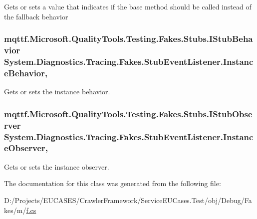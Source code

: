 Gets or sets a value that indicates if the base method should be called instead of the fallback behavior

\hypertarget{class_system_1_1_diagnostics_1_1_tracing_1_1_fakes_1_1_stub_event_listener_a73c0c067f87d82ef513bdcf0759c33cd}{
\subsubsection[{Instance\-Behavior}]{\setlength{\rightskip}{0pt plus 5cm}mqttf.\-Microsoft.\-Quality\-Tools.\-Testing.\-Fakes.\-Stubs.\-I\-Stub\-Behavior System.\-Diagnostics.\-Tracing.\-Fakes.\-Stub\-Event\-Listener.\-Instance\-Behavior\hspace{0.3cm}{\ttfamily [get]}, {\ttfamily [set]}}}\label{class_system_1_1_diagnostics_1_1_tracing_1_1_fakes_1_1_stub_event_listener_a73c0c067f87d82ef513bdcf0759c33cd}


Gets or sets the instance behavior.

\hypertarget{class_system_1_1_diagnostics_1_1_tracing_1_1_fakes_1_1_stub_event_listener_a9632efa813e08faca96bc80e3ddce724}{
\subsubsection[{Instance\-Observer}]{\setlength{\rightskip}{0pt plus 5cm}mqttf.\-Microsoft.\-Quality\-Tools.\-Testing.\-Fakes.\-Stubs.\-I\-Stub\-Observer System.\-Diagnostics.\-Tracing.\-Fakes.\-Stub\-Event\-Listener.\-Instance\-Observer\hspace{0.3cm}{\ttfamily [get]}, {\ttfamily [set]}}}\label{class_system_1_1_diagnostics_1_1_tracing_1_1_fakes_1_1_stub_event_listener_a9632efa813e08faca96bc80e3ddce724}


Gets or sets the instance observer.



The documentation for this class was generated from the following file\-:\begin{DoxyCompactItemize}
\item 
D\-:/\-Projects/\-E\-U\-C\-A\-S\-E\-S/\-Crawler\-Framework/\-Service\-E\-U\-Cases.\-Test/obj/\-Debug/\-Fakes/m/\hyperlink{m_2f_8cs}{f.\-cs}\end{DoxyCompactItemize}

